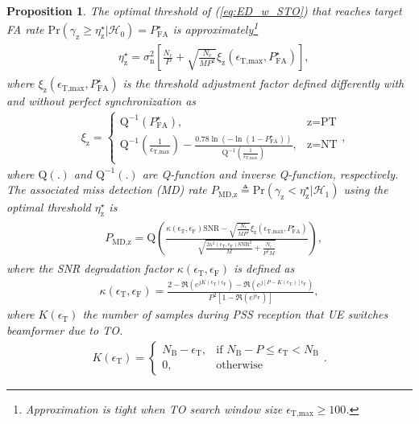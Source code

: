 \documentclass[journal]{IEEEtran}
\newtheorem{proposition}{Proposition}
\newcommand{\CFO}[0]{\epsilon_{\text{F}}}
\newcommand{\STO}[0]{\epsilon_{\text{T}}}
\newcommand{\Nb}[0]{N_{\text{B}}}
\newcommand{\Nc}[0]{N_{\text{c}}}
\newcommand{\sigman}[0]{\sigma_{\text{n}}}
\newcommand{\Q}[0]{\mathrm{Q}}
\newcommand{\Qinv}[0]{\mathrm{Q}^{-1}}
\newcommand{\SNR}[0]{\mathrm{SNR}}
\newcommand{\prob}[0]{\mathrm{Pr}}
\begin{document}
\begin{proposition}
\label{proposition:MD_w_STO}
The optimal threshold of (\ref{eq:ED_w_STO}) that reaches target FA rate $\prob(\gamma_{\text{z}} \geq \eta^{\star}_{\text{z}}|\mathcal{H}_0) = P^{\star}_{\text{FA}}$ is approximately\footnote{Approximation is tight when TO search window size $\epsilon_{\text{T,max}}\geq 100$.}
\begin{align}
\begin{split}
&\eta^{\star}_{\text{z}} = \sigman^2\left[\frac{\Nc}{P}+\sqrt{\frac{\Nc}{MP^2}}\xi_{\text{z}}\left(\epsilon_{\text{T,max}},P^{\star}_{\text{FA}}\right)\right],
\end{split}
\label{eq:TH_w_STO}
\end{align}
where $\xi_{\text{z}}(\epsilon_{\text{T,max}},P^{\star}_{\text{FA}})$ is the threshold adjustment factor defined differently with and without perfect synchronization as
\begin{align}
&\xi_{\text{z}} = \begin{cases}
\Qinv\left(P^{\star}_{\text{FA}}\right),& \text{z}=\text{PT}\\
\Qinv\left(\frac{1}{\epsilon_{\text{T,max}}}\right) - \frac{0.78\ln\left(-\ln\left(1-P^{\star}_{\text{FA}}\right)\right)}{\Qinv\left(\frac{1}{\epsilon_{\text{T,max}}}\right)},& \text{z}=\text{NT}
\end{cases},
\label{eq:xi_threshold_adjust}
\end{align} 
where $\Q(.)$ and $\Qinv(.)$ are Q-function and inverse Q-function, respectively. The associated miss detection (MD) rate $P_{\text{MD},\text{z}} \triangleq \prob\left(\gamma_{\text{z}} < \eta^{\star}_{\text{z}}|\mathcal{H}_1\right)$ using the optimal threshold $\eta^{\star}_{\text{z}}$ is
\begin{align}
\begin{split}
&P_{\text{MD},\text{z}} =
 \Q \left(\frac{\kappa(\STO,\CFO) \SNR -\sqrt{\frac{\Nc}{MP^2}}\xi_{\text{z}}\left(\epsilon_{\text{T,max}},P^{\star}_{\text{FA}}\right)}{\sqrt{\frac{2\kappa^2(\STO,\CFO)\SNR^2}{M}+ \frac{\Nc}{P^2M}}}\right),
\end{split}
\label{eq:PMD_w_STO}
\end{align}
where the SNR degradation factor $\kappa(\STO,\CFO)$ is defined as
\begin{align}
\kappa(\STO,\CFO) = \frac{2-\Re\left(e^{jK(\STO)\CFO}\right)-\Re\left(e^{j[P-K(\STO)]\CFO}\right)}{P^2\left[1-\Re\left(e^{j\CFO}\right)\right]},
\label{eq:kappa_SNR_degradation}
\end{align}
where $K(\STO)$ the number of samples during PSS reception that UE switches beamformer  due to TO. 
\begin{align}
K(\STO)=
\begin{cases}
\Nb-\STO, &\text{if } \Nb-P \leq \STO < \Nb\\
0,     &\text{otherwise}
\end{cases}.
\label{eq:define_gain_split_K}
\end{align}


\end{proposition}
\end{document}
